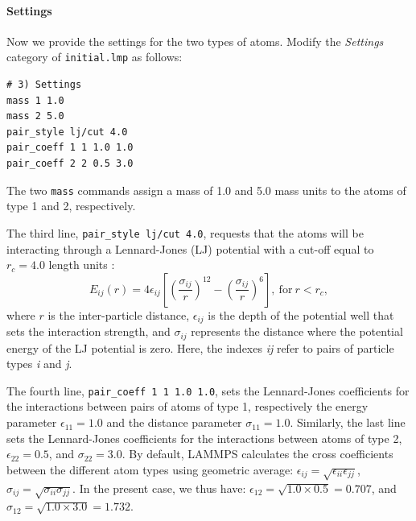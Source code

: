 \documentclass[9pt,tutorial]{livecoms}
\newcommand{\lmpcmd}[1]{\hspace{0pt}\colorbox{listing}{\textcolor{command}{\texttt{#1}}}\hspace{0pt}} %
\newcommand{\flecmd}[1]{\textcolor{command}{\texttt{#1}}} %
\begin{document}
\paragraph{Settings}
Now we provide the settings for the two types of atoms.  Modify the
\textit{Settings} category of \flecmd{initial.lmp} as follows:
\begin{lstlisting}
# 3) Settings
mass 1 1.0
mass 2 5.0
pair_style lj/cut 4.0
pair_coeff 1 1 1.0 1.0
pair_coeff 2 2 0.5 3.0
\end{lstlisting}

The two \lmpcmd{mass} commands assign a mass of 1.0 and 5.0 mass units
to the atoms of type 1 and 2, respectively.

The third line, \lmpcmd{pair\_style lj/cut 4.0}, requests that the atoms
will be interacting through a Lennard-Jones (LJ) potential with a
cut-off equal to $r_c = 4.0$ length units
\cite{wang2020lennard,fischer2023history}:
$$E_{ij} (r) = 4 \epsilon_{ij} \left[ \left( \dfrac{\sigma_{ij}}{r} \right)^{12}
  - \left( \dfrac{\sigma_{ij}}{r} \right)^{6} \right], ~ \text{for} ~ r
< r_c,$$ where $r$ is the inter-particle distance, $\epsilon_{ij}$ is
the depth of the potential well that sets the interaction strength, and
$\sigma_{ij}$ represents the distance where the potential energy of the
LJ potential is zero.  Here, the indexes \textit{ij} refer to pairs of
particle types \textit{i} and \textit{j}.

The fourth line, \lmpcmd{pair\_coeff 1 1 1.0 1.0}, sets the
Lennard-Jones coefficients for the interactions between pairs of atoms
of type 1, respectively the energy parameter $\epsilon_{11} = 1.0$ and
the distance parameter $\sigma_{11} = 1.0$.  Similarly, the last line
sets the Lennard-Jones coefficients for the interactions between atoms
of type 2, $\epsilon_{22} = 0.5$, and $\sigma_{22} = 3.0$.  By default,
LAMMPS calculates the cross coefficients between the different atom
types using geometric average:
$\epsilon_{ij} = \sqrt{\epsilon_{ii} \epsilon_{jj}}$,
$\sigma_{ij} = \sqrt{\sigma_{ii} \sigma_{jj}}$.  In the present case, we
thus have: $\epsilon_{12} = \sqrt{1.0 \times 0.5} = 0.707$, and
$\sigma_{12} = \sqrt{1.0 \times 3.0} = 1.732$.
\end{document}
